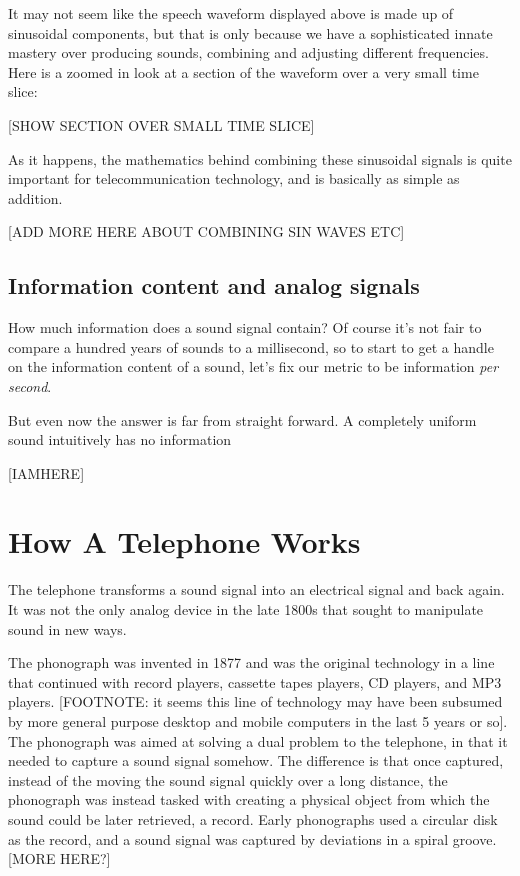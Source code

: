\documentclass[UTF8]{book}
\begin{document}
\begin{CJK}{UTF8}{gbsn}
It may not seem like the speech waveform displayed above is made up of sinusoidal components, but that is only because we have a sophisticated innate mastery over producing sounds, combining and adjusting different frequencies. Here is a zoomed in look at a section of the waveform over a very small time slice:

[SHOW SECTION OVER SMALL TIME SLICE]

As it happens, the mathematics behind combining these sinusoidal signals is quite important for telecommunication technology, and is basically as simple as addition.

[ADD MORE HERE ABOUT COMBINING SIN WAVES ETC]

\section{Information content and analog signals}

How much information does a sound signal contain? Of course it's not fair to compare a hundred years of sounds to a millisecond, so to start to get a handle on the information content of a sound, let's fix our metric to be information \emph{per second}.

But even now the answer is far from straight forward. A completely uniform sound intuitively has no information

[IAMHERE]

\chapter{How A Telephone Works}

The telephone transforms a sound signal into an electrical signal and back again. It was not the only analog device in the late 1800s that sought to manipulate sound in new ways.

The phonograph was invented in 1877 and was the original technology in a line that continued with record players, cassette tapes players, CD players, and MP3 players. [FOOTNOTE: it seems this line of technology may have been subsumed by more general purpose desktop and mobile computers in the last 5 years or so]. The phonograph was aimed at solving a dual problem to the telephone, in that it needed to capture a sound signal somehow. The difference is that once captured, instead of the moving the sound signal quickly over a long distance, the phonograph was instead tasked with creating a physical object from which the sound could be later retrieved, a record. Early phonographs used a circular disk as the record, and a sound signal was captured by deviations in a spiral groove. [MORE HERE?]


\end{CJK}
\end{document}
